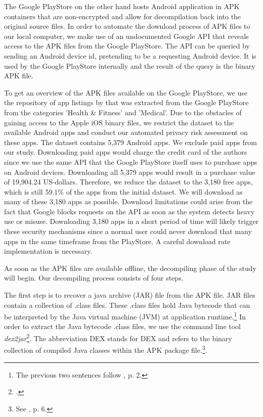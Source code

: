 \documentclass[
	a4paper,
	oneside,
	12pt,
	liststotocnumbered
]{article}
\let\cite\textcite
\begin{document}
The Google PlayStore on the other hand hosts Android application in \acs{APK} containers that are non-encrypted and allow for decompilation back into the original source files. 
In order to automate the download process of \acs{APK} files to our local computer, we make use of an undocumented Google \acs{API} that reveals access to the \acs{APK} files from the Google PlayStore. 
The \acs{API} can be queried by sending an Android device id, pretending to be a requesting Android device. It is used by the Google PlayStore internally and the result of the query is the binary \acs{APK} file.

To get an overview of the APK files available on the Google PlayStore, we use the repository of app listings by \cite{Xu2015} that was extracted from the Google PlayStore from the categories 'Health \& Fitness' and 'Medical'.
Due to the obstacles of gaining access to the Apple iOS binary files, we restrict the dataset to the available Android apps and conduct our automated privacy risk assessment on these apps.
The \cite{Xu2015} dataset contains 5,379 Android apps. 
We exclude paid apps from our study. Downloading paid apps would charge the credit card of the authors since we use the same \acs{API} that the Google PlayStore itself uses to purchase apps on Android devices. 
Downloading all 5,379 apps would result in a purchase value of 19,904.24 US-dollars. 
Therefore, we reduce the dataset to the 3,180 free apps, which is still 59.1\% of the apps from the initial dataset. 
We will download as many of these 3,180 apps as possible.
Download limitations could arise from the fact that Google blocks requests on the API as soon as the system detects heavy use or misuse. 
Downloading 3,180 apps in a short period of time will likely trigger these security mechanisms since a normal user could never download that many apps in the same timeframe from the PlayStore.
A careful download rate implementation is necessary.

As soon as the \acs{APK} files are available offline, the decompiling phase of the study will begin.
Our decompiling process consists of four steps.

The first step is to recover a java archive (\acs{JAR}) file from the \acs{APK} file.
\acs{JAR} files contain a collection of .class files. 
These .class files hold Java bytecode that can be interpreted by the Java virtual machine (\acs{JVM}) at application runtime.\footnote{The previous two sentences follow \cite{Enck2011}, p. 2.} 
In order to extract the Java bytecode .class files, we use the command line tool \textit{dex2jar}\footnote{\cite{Pan2010}.}. 
The abbreviation \acs{DEX} stands for \acl{DEX} and refers to the binary collection of compiled Java classes within the \acs{APK} package file.\footnote{See \cite{xu2013}, p. 6.}.
\end{document}
